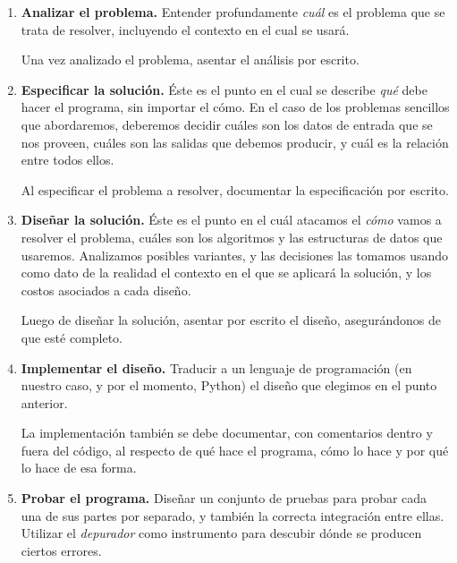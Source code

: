\begin{enumerate}
\item {\bf Analizar el problema.} Entender profundamente {\it cuál} es
el problema que se trata de resolver, incluyendo el contexto en el
cual se usará.

\begin{observacion}
Una vez analizado el problema, asentar el análisis por escrito.
\end{observacion}

\item {\bf Especificar la solución.} Éste es el punto en el cual
se describe {\it qué} debe hacer el programa, sin importar
el cómo. En el caso de los problemas sencillos que abordaremos,
deberemos decidir cuáles son los datos de entrada que se nos
proveen, cuáles son las salidas que debemos producir, y cuál es la
relación entre todos ellos.

\begin{observacion}
Al especificar el problema a resolver, documentar la especificación por
escrito.
\end{observacion}

\item {\bf Diseñar la solución.} Éste es el punto en el cuál
atacamos el {\it cómo} vamos a resolver el problema, cuáles son
los algoritmos y las estructuras de datos que usaremos. Analizamos
posibles variantes, y las decisiones las tomamos usando como dato
de la realidad el contexto en el que se aplicará la solución, y
los costos asociados a cada diseño.

\begin{observacion}
Luego de diseñar la solución, asentar por escrito el diseño, asegurándonos de
que esté completo.
\end{observacion}

\item {\bf Implementar el diseño.} Traducir a un lenguaje de
programación (en nuestro caso, y por el momento, Python) el diseño
que elegimos en el punto anterior.

\begin{observacion}
La implementación también se debe documentar, con comentarios
dentro y fuera del código, al respecto de qué hace el programa, cómo lo hace y
por qué lo hace de esa forma.
\end{observacion}

\item {\bf Probar el programa.} Diseñar un conjunto de pruebas
para probar cada una de sus partes por separado, y también la
correcta integración entre ellas. Utilizar el {\it depurador} como
instrumento para descubir dónde se producen ciertos errores.


\end{enumerate}
